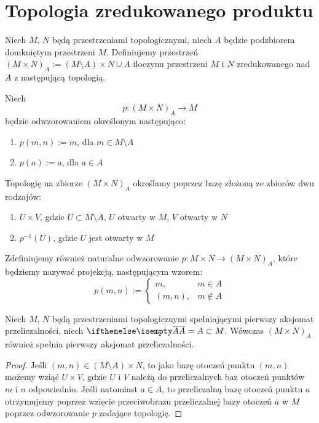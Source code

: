 \section{Topologia zredukowanego produktu}
\begin{df}
  Niech $M$, $N$ będą przestrzeniami topologicznymi, niech $A$ będzie podzbiorem domkniętym przestrzeni $M$. Definiujemy przestrzeń $(M \times N)_A := (M \setminus A) \times N \cup A$ iloczynu przestrzeni $M$ i $N$ zredukowanego nad $A$ z następującą topologią.
  
  Niech
  \[
    p: (M \times N)_A \rightarrow M
  \]
  będzie odwzorowaniem określonym następująco:
  \begin{enumerate}
    \item $p(m, n) := m$, dla $m \in M \setminus A$
    \item $p(a) := a$, dla $a \in A$
  \end{enumerate}
  
  Topologię na zbiorze $(M \times N)_A$ określamy poprzez bazę złożoną ze zbiorów dwu rodzajów:
  \begin{enumerate}
    \item $U \times V$, gdzie $U \subset M \setminus A$, $U$ otwarty w $M$, $V$ otwarty w $N$
    \item $p^{-1}(U)$, gdzie $U$ jest otwarty w $M$
  \end{enumerate}
  
  Zdefiniujemy również naturalne odwzorowanie $p: M\times N \to (M\times N)_A$, które będziemy nazywać projekcją, następującym wzorem:
  \[
    p(m,n) := \begin{cases}
      m,& m\in A \\
      (m,n),& m\not\in A
    \end{cases}
  \]
\end{df}

\begin{prop} \label{prop:reduced-prod-first-countable}
  Niech $M$, $N$ będą przestrzeniami topologicznymi spełniającymi pierwszy aksjomat przeliczalności, niech $\cl A = A \subset M$. Wówczas $(M\times N)_A$ również spełnia pierwszy aksjomat przeliczalności.
  \begin{proof}
    Jeśli $(m,n) \in (M\setminus A) \times N$, to jako bazę otoczeń punktu $(m,n)$ możemy wziąć $U\times V$, gdzie $U$ i $V$ należą do przeliczalnych baz otoczeń punktów $m$ i $n$ odpowiednio. Jeśli natomiast $a \in A$, to przeliczalną bazę otoczeń punktu $a$ otrzymujemy poprzez wzięcie przeciwobrazu przeliczalnej bazy otoczeń $a$ w $M$ poprzez odwzorowanie $p$ zadające topologię.
  \end{proof}
\end{prop}

